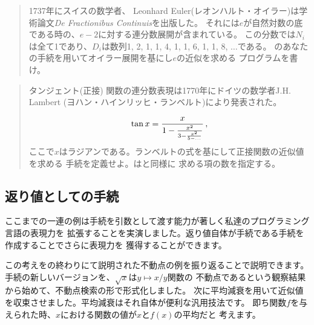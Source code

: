 \begin{quote}
 1737年にスイスの数学者、
Leonhard Euler(レオンハルト・オイラー)は学術論文\textit{De Fractionibus Continuis}を出版した。
それには\( e \)が自然対数の底である時の、\( e - 2 \)に対する連分数展開が含まれている。
この分数では\( N_i \)は全て1であり、\( D_i \)は数列1, 2, 1, 1, 4, 1, 1, 6, 1, 1, 8, \( \dots \)である。
のあなたの手続を用いてオイラー展開を基にし\( e \)の近似を求める
プログラムを書け。
\end{quote}

\begin{quote}
 タンジェント(正接)
関数の連分数表現は1770年にドイツの数学者J.H. Lambert
(ヨハン・ハインリッヒ・ランベルト)により発表された。
\begin{comment}

\begin{example}
              x
tan x = ---------------
                x^2
        1 - -----------
                  x^2
            3 - -------
                5 - ...
\end{example}

\end{comment}
\begin{displaymath}
 {\tan x} = {x \over {1 - {x^2 \over {3 - {x^2 \over 5 - \dots}}}}}\,, 
\end{displaymath}
\noindent
ここで\( x \)はラジアンである。ランベルトの式を基にして正接関数の近似値を求める
手続を定義せよ。はと同様に
求める項の数を指定する。
\end{quote}

\label{Section 1.3.4}
\subsection{返り値としての手続}



ここまでの一連の例は手続を引数として渡す能力が著しく私達のプログラミング言語の表現力を
拡張することを実演しました。返り値自体が手続である手続を作成することでさらに表現力を
獲得することができます。


この考えをの終わりにて説明された不動点の例を振り返ることで説明できます。
手続の新しいバージョンを、\( \sqrt{x} \)は\( y \mapsto x / y \)関数の
不動点であるという観察結果から始めて、不動点検索の形で形式化しました。
次に平均減衰を用いて近似値を収束させました。平均減衰はそれ自体が便利な汎用技法です。
即ち関数\( f \)を与えられた時、\( x \)における関数の値が\( x \)と\( f(x) \)の平均だと
考えます。


